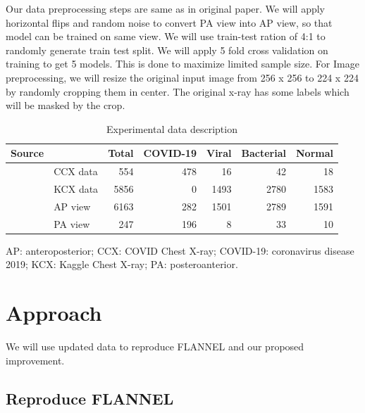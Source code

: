 \documentclass{sigkddExp}
\begin{document}
Our data preprocessing steps are same as in original paper. We will apply
horizontal flips and random noise to convert PA view into AP view, so that model
can be trained on same view. We will use train-test ration of 4:1 to randomly
generate train test split. We will apply 5 fold cross validation on training to
get 5 models. This is done to maximize limited sample size. For Image
preprocessing, we will resize the original input image from 256 x 256 to 224 x
224 by randomly cropping them in center. The original x-ray has some labels
which will be masked by the crop.

\begin{table}
    \centering
    \caption{Experimental data description}
    \label{table:datastats}
    \begin{tabular}{llrrrrr} \hline
        Source                              &          & Total & COVID-19 & Viral & Bacterial & Normal \\ \hline
        \multirow{2}{*}{} Original data     & CCX data & 554   & 478      & 16    & 42        & 18     \\
                                            & KCX data & 5856  & 0        & 1493  & 2780      & 1583   \\ \hline
        \multirow{2}{*}{} View Distribution & AP view  & 6163  & 282      & 1501  & 2789      & 1591   \\
                                            & PA view  & 247   & 196      & 8     & 33        & 10     \\ \hline
    \end{tabular}\par
    \bigskip
    AP: anteroposterior; CCX: COVID Chest X-ray; COVID-19: coronavirus disease 2019;
    KCX: Kaggle Chest X-ray; PA: posteroanterior.
\end{table}


\section{Approach}

We will use updated data to reproduce FLANNEL and our proposed improvement.

\subsection{Reproduce FLANNEL}
\end{document}
